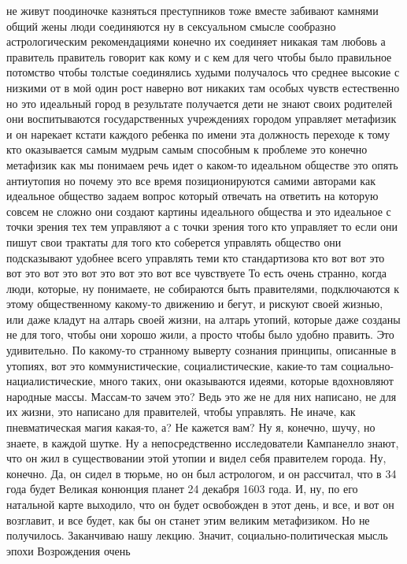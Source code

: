 не живут поодиночке казняться преступников тоже вместе забивают камнями общий
жены люди соединяются ну в сексуальном смысле сообразно астрологическим
рекомендациями конечно их соединяет никакая там любовь а правитель правитель
говорит как кому и с кем для чего чтобы было правильное потомство чтобы толстые
соединялись худыми получалось что среднее высокие с низкими от в мой один рост
наверно вот никаких там особых чувств естественно но это идеальный город в
результате получается дети не знают своих родителей они воспитываются
государственных учреждениях городом управляет метафизик и он нарекает кстати
каждого ребенка по имени эта должность переходе к тому кто оказывается самым
мудрым самым способным к проблеме это конечно метафизик как мы понимаем речь
идет о каком-то идеальном обществе это опять антиутопия но почему это все время
позиционируются самими авторами как идеальное общество задаем вопрос который
отвечать на ответить на которую совсем не сложно они создают картины идеального
общества и это идеальное с точки зрения тех тем управляют а с точки зрения того
кто управляет то если они пишут свои трактаты для того кто соберется управлять
общество они подсказывают удобнее всего управлять теми кто стандартизова кто вот
вот это вот это вот это вот это вот это вот все чувствуете То есть очень
странно, когда люди, которые, ну понимаете, не собираются быть правителями,
подключаются к этому общественному какому-то движению и бегут, и рискуют своей
жизнью, или даже кладут на алтарь своей жизни, на алтарь утопий, которые даже
созданы не для того, чтобы они хорошо жили, а просто чтобы было удобно править.
Это удивительно. По какому-то странному выверту сознания принципы, описанные в
утопиях, вот это коммунистические, социалистические, какие-то там социально-
нациалистические, много таких, они оказываются идеями, которые вдохновляют
народные массы. Массам-то зачем это? Ведь это же не для них написано, не для их
жизни, это написано для правителей, чтобы управлять. Не иначе, как
пневматическая магия какая-то, а? Не кажется вам? Ну я, конечно, шучу, но
знаете, в каждой шутке. Ну а непосредственно исследователи Кампанелло знают, что
он жил в существовании этой утопии и видел себя правителем города. Ну, конечно.
Да, он сидел в тюрьме, но он был астрологом, и он рассчитал, что в 34 года будет
Великая конюнция планет 24 декабря 1603 года. И, ну, по его натальной карте
выходило, что он будет освобожден в этот день, и все, и вот он возглавит, и все
будет, как бы он станет этим великим метафизиком. Но не получилось. Заканчиваю
нашу лекцию. Значит, социально-политическая мысль эпохи Возрождения очень
